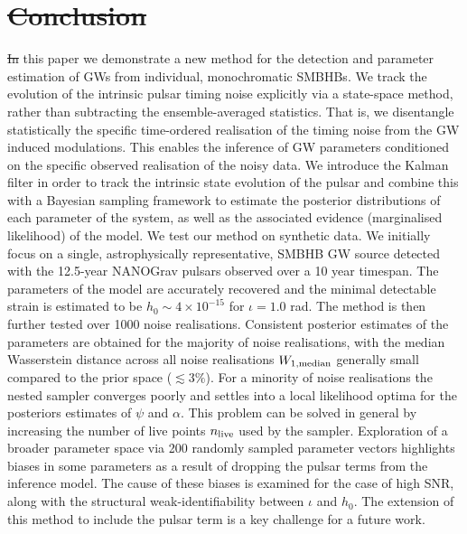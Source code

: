 \documentclass[fleqn,usenatbib,useAMS]{mnras}
\providecommand{\DIFadd}[1]{{\protect\color{blue}\uwave{#1}}} %
\providecommand{\DIFdel}[1]{{\protect\color{red}\sout{#1}}}                      %
\providecommand{\DIFaddbegin}{} %
\providecommand{\DIFaddend}{} %
\providecommand{\DIFdelend}{} %
\newcommand{\DIFaddincludegraphics}[2][]{{\color{blue}\fbox{\DIFOincludegraphics[#1]{#2}}}} %
\DeclareRobustCommand{\DIFaddbegin}{\DIFOaddbegin \let\includegraphics\DIFaddincludegraphics} %
\DeclareRobustCommand{\DIFaddend}{\DIFOaddend \let\includegraphics\DIFOincludegraphics} %
\DeclareRobustCommand{\DIFdelend}{\DIFOaddend \let\includegraphics\DIFOincludegraphics} %
\begin{document}
\section{\DIFdel{Conclusion}}%
\addtocounter{section}{-1}%
\DIFdel{In }\DIFdelend \DIFaddbegin \DIFadd{To conclude, in }\DIFaddend this paper we demonstrate a new method for the detection and parameter estimation of GWs from individual, monochromatic SMBHBs. We track the evolution of the intrinsic pulsar timing noise explicitly via a state-space method, rather than subtracting the ensemble-averaged statistics. That is, we disentangle statistically the specific time-ordered realisation of the timing noise from the GW induced modulations. This enables the inference of GW parameters conditioned on the specific observed realisation of the noisy data. We introduce the Kalman filter in order to track the intrinsic state evolution of the pulsar and combine this with a Bayesian sampling framework to estimate the posterior distributions of each parameter of the system, as well as the associated evidence (marginalised likelihood) of the model. We test our method on synthetic data. We initially focus on a single, astrophysically representative, SMBHB GW source detected with the 12.5-year NANOGrav pulsars observed over a 10 year timespan. The parameters of the model are accurately recovered and the minimal detectable strain is estimated to be $h_0 \sim 4 \times 10^{-15}$ for $\iota=1.0$ rad. The method is then further tested over 1000 noise realisations. Consistent posterior estimates of the parameters are obtained for the majority of noise realisations, with the median Wasserstein distance across all noise realisations $W_{1, \rm median}$ generally small compared to the prior space ($\lesssim 3 \%$). For a minority of noise realisations the nested sampler converges poorly and settles into a local likelihood optima for the posteriors estimates of $\psi$ and $\alpha$. This problem can be solved in general by increasing the number of live points $n_{\rm live}$ used by the sampler. Exploration of a broader parameter space via 200 randomly sampled parameter vectors highlights biases in some parameters as a result of dropping the pulsar terms from the inference model. The cause of these biases is examined for the case of high SNR, along with the structural weak-identifiability between $\iota$ and $h_0$. The extension of this method to include the pulsar term is a key challenge for a future work.

 
\end{document}
